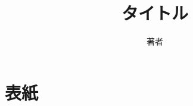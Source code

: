 \documentclass[aspectratio=169, hyperref={bookmarks=true}, dvipdfmx, 12pt]{beamer}
\title{タイトル}
\author{著者}
\institute{所属}
\date{}
\begin{document}
\section*{表紙}

\begin{frame}
  \titlepage\
\end{frame}

\appendix
\end{document}
